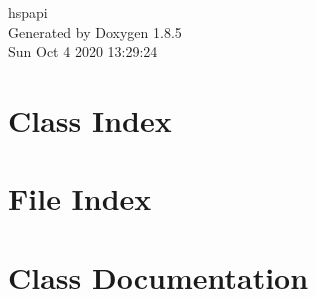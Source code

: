 \documentclass[twoside]{book}
\newcommand{\clearemptydoublepage}{%
  \newpage{\pagestyle{empty}\cleardoublepage}%
}
\begin{document}
\hypersetup{pageanchor=false}
\begin{titlepage}
\vspace*{7cm}
\begin{center}%
{\Large hspapi }\\
\vspace*{1cm}
{\large Generated by Doxygen 1.8.5}\\
\vspace*{0.5cm}
{\small Sun Oct 4 2020 13:29:24}\\
\end{center}
\end{titlepage}
\clearemptydoublepage
\tableofcontents
\clearemptydoublepage
{}
\hypersetup{pageanchor=true}

\chapter{Class Index}

\chapter{File Index}

\chapter{Class Documentation}








































\end{document}

